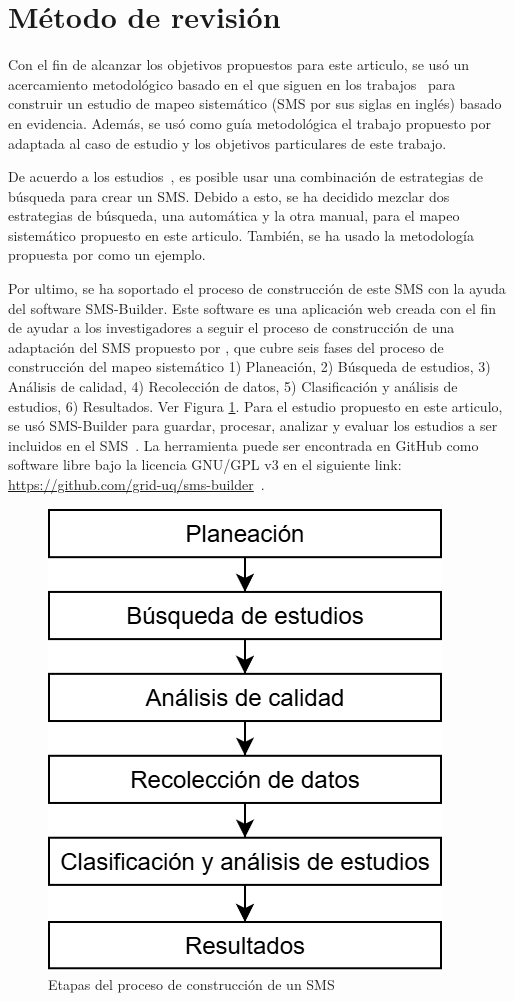 \section{Método de revisión}\label{sec:metodo-revision}
Con el fin de alcanzar los objetivos propuestos para este articulo, se usó un acercamiento metodológico basado en el que siguen en los trabajos~\cite{Kitchenham2010792, budgen2008using} para construir un estudio de mapeo sistemático (SMS por sus siglas en inglés) basado en evidencia. Además, se usó como guía metodológica el trabajo propuesto por \cite{Sepúlveda202141} adaptada al caso de estudio y los objetivos particulares de este trabajo.

De acuerdo a los estudios~\cite{Erica2017HybridSS, Nguyen201562}, es posible usar una combinación de estrategias de búsqueda para crear un SMS. Debido a esto, se ha decidido mezclar dos estrategias de búsqueda, una automática y la otra manual, para el mapeo sistemático propuesto en este articulo. También, se ha usado la metodología propuesta por \cite{Ali201988196} como un ejemplo.

Por ultimo, se ha soportado el proceso de construcción de este SMS con la ayuda del software SMS-Builder. Este software es una aplicación web creada con el fin de ayudar a los investigadores a seguir el proceso de construcción de una adaptación del SMS propuesto por \cite{Kitchenham2010792}, que cubre seis fases del proceso de construcción del mapeo     sistemático 1) Planeación, 2) Búsqueda de estudios, 3) Análisis de calidad, 4) Recolección de datos, 5) Clasificación y análisis de estudios, 6) Resultados. Ver Figura \ref{figure:Stages}.
Para el estudio propuesto en este articulo, se usó SMS-Builder para guardar, procesar, analizar y evaluar los estudios a ser incluidos en el SMS~\cite{Candela2022100935}. La herramienta puede ser encontrada en GitHub como software libre bajo la licencia GNU/GPL v3 en el siguiente link: \url{https://github.com/grid-uq/sms-builder}~\cite{Candela2022100935}.

\begin{figure}[htbp]
	\centering
	\includegraphics[width=0.6\linewidth]{resources/figures/sms-Etapas.drawio.png}
	\caption{Etapas del proceso de construcción de un SMS}
	\label{figure:Stages}
\end{figure}

